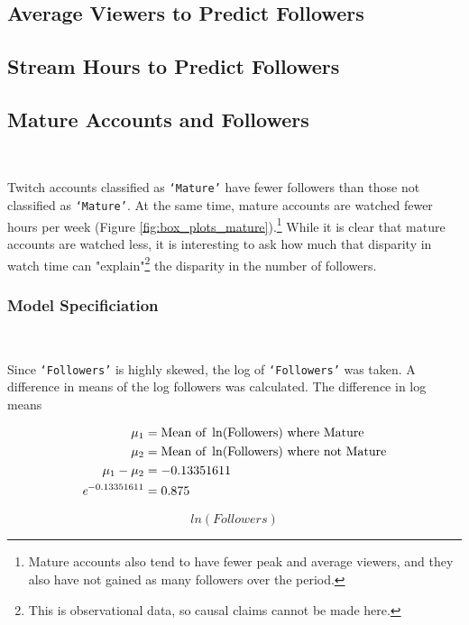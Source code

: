 \documentclass[12pt]{article}
\begin{document}
\subsection{Average Viewers to Predict Followers}

\subsection{Stream Hours to Predict Followers}


\subsection{Mature Accounts and Followers}\

Twitch accounts classified as \texttt{`Mature'} have fewer followers than those not classified as \texttt{`Mature'}. At the same time, mature accounts are watched fewer hours per week (Figure \ref{fig:box_plots_mature}).\footnote{Mature accounts also tend to have fewer peak and average viewers, and they also have not gained as many followers over the period.} While it is clear that mature accounts are watched less, it is interesting to ask how much that disparity in watch time can "explain"\footnote{This is observational data, so causal claims cannot be made here.} the disparity in the number of followers.

\subsubsection{Model Specificiation}\

Since \texttt{`Followers'} is highly skewed, the log of \texttt{`Followers'} was taken. A difference in means of the log followers was calculated. The difference in log means

\begin{equation}
\begin{aligned}
\mu_{1} & = \text{Mean of } \ln(\text{Followers}) \text{ where Mature} \\
\mu_{2} & = \text{Mean of } \ln(\text{Followers}) \text{ where not Mature} \\
\mu_{1} - \mu_{2} & = -0.13351611 \\
\emph{e}^{-0.13351611} & = 0.875
\end{aligned}
\end{equation}



\begin{equation}
ln(Followers)
\end{equation}
\end{document}
